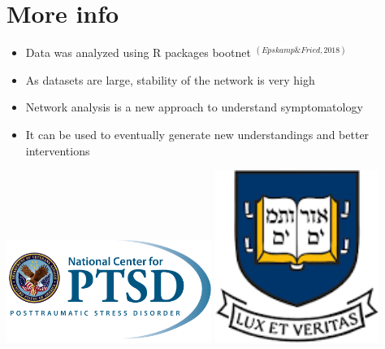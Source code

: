 \documentclass[]{betterposter}
\begin{document}
{\section{More info}
\begin{itemize}
    \item Data was analyzed using R packages bootnet $^{(Epskamp \& Fried, 2018)}$
    \item As datasets are large, stability of the network is very high
    \item Network analysis is a new approach to understand symptomatology
    \item It can be used to eventually generate new understandings and better interventions
\end{itemize}

\vfill
\begin{flushright}
    

    
\includegraphics[width=0.5\textwidth]{img/NCPTSD_Logo.png}
\hfill
\includegraphics[width=0.4\textwidth]{img/Yale.png}
\end{flushright}
}
\end{document}
